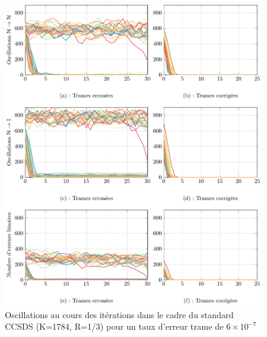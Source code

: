 \begin{figure}[!ht]
	\begin{center}
	\includegraphics[width=.9\textwidth]{main/ch2_fig/tikz/it_ccsds610-7.pdf}
	\caption{Oscillations au cours des itérations dans le cadre du standard CCSDS (K=1784, R=1/3) pour un taux d'erreur trame de $6\times10^{-7}$\label{fig:it2_ccsds}}
	\end{center}
\end{figure}

